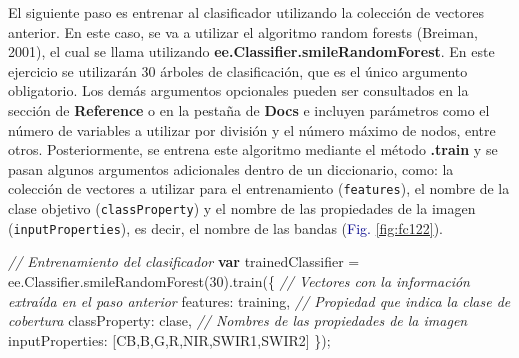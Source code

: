 \documentclass[
  12pt,
  letterpaper,
  twoside]{book}
\newenvironment{Shaded}{\begin{snugshade}}{\end{snugshade}}
\newcommand{\AttributeTok}[1]{\textcolor[rgb]{0.48,0.12,0.64}{#1}}
\newcommand{\CommentTok}[1]{\textcolor[rgb]{0.24,0.58,0.00}{\textit{#1}}}
\newcommand{\DataTypeTok}[1]{\textcolor[rgb]{0.00,0.00,0.00}{#1}}
\newcommand{\DecValTok}[1]{\textcolor[rgb]{0.28,0.53,0.93}{#1}}
\newcommand{\FunctionTok}[1]{\textcolor[rgb]{0.48,0.12,0.64}{#1}}
\newcommand{\KeywordTok}[1]{\textcolor[rgb]{0.00,0.00,0.00}{\textbf{#1}}}
\newcommand{\NormalTok}[1]{#1}
\newcommand{\OperatorTok}[1]{\textcolor[rgb]{0.00,0.00,0.00}{#1}}
\newcommand{\StringTok}[1]{\textcolor[rgb]{0.87,0.29,0.22}{#1}}
\newcommand\boldpurple[1]{\textcolor{darkpurple}{\textbf{#1}}}
\begin{document}
El siguiente paso es entrenar al clasificador utilizando la colección de vectores anterior. En este caso, se va a utilizar el algoritmo random forests (Breiman, 2001), el cual se llama utilizando \boldpurple{ee.Classifier.smileRandomForest}. En este ejercicio se utilizarán 30 árboles de clasificación, que es el único argumento obligatorio. Los demás argumentos opcionales pueden ser consultados en la sección de \textbf{Reference} o en la pestaña de \textbf{Docs} e incluyen parámetros como el número de variables a utilizar por división y el número máximo de nodos, entre otros. Posteriormente, se entrena este algoritmo mediante el método \boldpurple{.train} y se pasan algunos argumentos adicionales dentro de un diccionario, como: la colección de vectores a utilizar para el entrenamiento (\texttt{features}), el nombre de la clase objetivo (\texttt{classProperty}) y el nombre de las propiedades de la imagen (\texttt{inputProperties}), es decir, el nombre de las bandas (\textcolor{darkblue}{Fig.} \ref{fig:fc122}).

\begin{Shaded}
\begin{Highlighting}[]
\CommentTok{// Entrenamiento del clasificador}
\KeywordTok{var}\NormalTok{ trainedClassifier }\OperatorTok{=}\NormalTok{ ee}\OperatorTok{.}\AttributeTok{Classifier}\OperatorTok{.}\FunctionTok{smileRandomForest}\NormalTok{(}\DecValTok{30}\NormalTok{)}\OperatorTok{.}\FunctionTok{train}\NormalTok{(\{}
  \CommentTok{// Vectores con la información extraída en el paso anterior}
  \DataTypeTok{features}\OperatorTok{:}\NormalTok{ training}\OperatorTok{,}
  \CommentTok{// Propiedad que indica la clase de cobertura}
  \DataTypeTok{classProperty}\OperatorTok{:} \StringTok{\textquotesingle{}clase\textquotesingle{}}\OperatorTok{,}
  \CommentTok{// Nombres de las propiedades de la imagen}
  \DataTypeTok{inputProperties}\OperatorTok{:}\NormalTok{ [}\StringTok{\textquotesingle{}CB\textquotesingle{}}\OperatorTok{,}\StringTok{\textquotesingle{}B\textquotesingle{}}\OperatorTok{,}\StringTok{\textquotesingle{}G\textquotesingle{}}\OperatorTok{,}\StringTok{\textquotesingle{}R\textquotesingle{}}\OperatorTok{,}\StringTok{\textquotesingle{}NIR\textquotesingle{}}\OperatorTok{,}\StringTok{\textquotesingle{}SWIR1\textquotesingle{}}\OperatorTok{,}\StringTok{\textquotesingle{}SWIR2\textquotesingle{}}\NormalTok{]}
\NormalTok{\})}\OperatorTok{;}
\end{Highlighting}
\end{Shaded}
\end{document}
